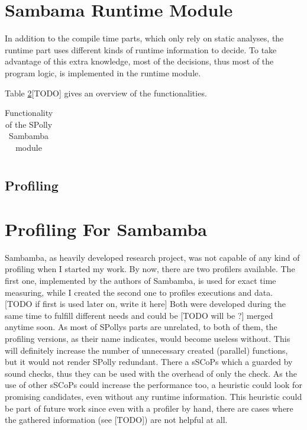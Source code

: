 \section{Sambama Runtime Module}

In addition to the compile time parts, which only rely on static analyses,
the runtime part uses different kinds of runtime information to decide. 
To take advantage of this extra knowledge, most of the decisions, thus most of
the program logic, is implemented in the runtime module. 


Table \ref{}[TODO] gives an overview of the functionalities.


\begin{table}[htbp]
  \caption{Functionality of the SPolly Sambamba module}
  \begin{tabular}{| l |}
    \hline
    
    \hline
    \hline

    \hline
  \end{tabular}
\end{table}



\subsection{Profiling}


\section{Profiling For Sambamba}

Sambamba, as heavily developed research project, was not capable of any kind
of profiling when I started my work. By now, there are two profilers available.
The first one, implemented by the authors of Sambamba, 
is used for exact time measuring, while I created the second one to profiles
executions and data.
[TODO if first is used later on, write it here] Both were
developed during the same time to fulfill different needs and could be
[TODO will be ?]  merged anytime soon. 
As most of SPollys parts are unrelated, to both of them, 
the profiling versions, as their name indicates, would become useless without.
This will definitely increase the number of unnecessary created (parallel) 
functions, but it would not render SPolly redundant.
There a sSCoPs which a guarded by sound checks, thus they can be used with the
overhead of only the check. As the use of other sSCoPs could increase the 
performance too, a heuristic could look for promising candidates, even without
any runtime information. This heuristic could be part of future work since even
with a profiler by hand, there are cases where the gathered information
(see [TODO]) are not helpful at all.




